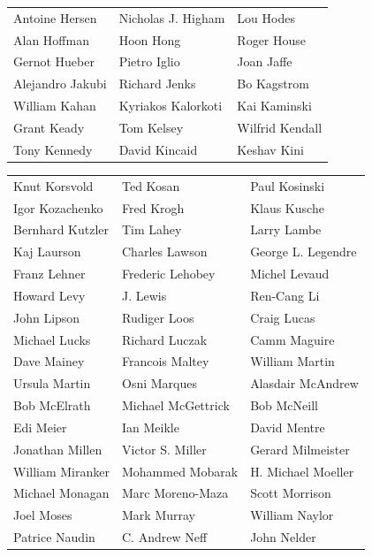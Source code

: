 \begin{tabular}{lll}
Antoine Hersen         & Nicholas J. Higham     & Lou Hodes\\
Alan Hoffman           & Hoon Hong              & Roger House\\
Gernot Hueber          & Pietro Iglio           & Joan Jaffe\\
Alejandro Jakubi       & Richard Jenks          & Bo Kagstrom\\
William Kahan          & Kyriakos Kalorkoti     & Kai Kaminski\\
Grant Keady            & Tom Kelsey             & Wilfrid Kendall\\
Tony Kennedy           & David Kincaid          & Keshav Kini\\
\end{tabular}
\vfill
\newpage
\begin{tabular}{lll}
Knut Korsvold          & Ted Kosan              & Paul Kosinski\\
Igor Kozachenko        & Fred Krogh             & Klaus Kusche\\
Bernhard Kutzler       & Tim Lahey              & Larry Lambe\\
Kaj Laurson            & Charles Lawson         & George L. Legendre\\
Franz Lehner           & Frederic Lehobey       & Michel Levaud\\
Howard Levy            & J. Lewis               & Ren-Cang Li\\
John Lipson            & Rudiger Loos           & Craig Lucas\\
Michael Lucks          & Richard Luczak         & Camm Maguire\\
Dave Mainey            & Francois Maltey        & William Martin\\
Ursula Martin          & Osni Marques           & Alasdair McAndrew\\
Bob McElrath           & Michael McGettrick     & Bob McNeill\\
Edi Meier              & Ian Meikle             & David Mentre\\
Jonathan Millen        & Victor S. Miller       & Gerard Milmeister\\
William Miranker       & Mohammed Mobarak       & H. Michael Moeller\\
Michael Monagan        & Marc Moreno-Maza       & Scott Morrison\\
Joel Moses             & Mark Murray            & William Naylor\\
Patrice Naudin         & C. Andrew Neff         & John Nelder\\

\end{tabular}
